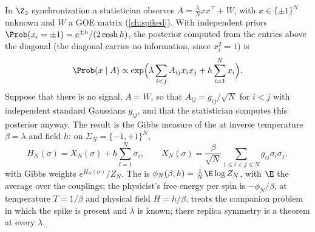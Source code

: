 \begin{refsection}
In $\Z_2$ synchronization a statistician observes $A=\frac\lambda Nxx^\top+W$, with $x\in\{\pm1\}^N$ unknown and $W$ a GOE matrix (\cref{ch:spiked}). With independent priors $\Prob(x_i=\pm1)=e^{\pm h}/(2\cosh h)$, the posterior computed from the entries above the diagonal (the diagonal carries no information, since $x_i^2=1$) is
\[
\Prob(x\mid A)\propto\exp\Bigl(\lambda\sum_{i<j}A_{ij}x_ix_j+h\sum_{i=1}^Nx_i\Bigr).
\]
Suppose that there is no signal, $A=W$, so that $A_{ij}=g_{ij}/\sqrt N$ for $i<j$ with independent standard Gaussians $g_{ij}$, and that the statistician computes this posterior anyway. The result is the Gibbs measure of the  \parencite{SherringtonKirkpatrick1975} at inverse temperature $\beta=\lambda$ and field $h$: on $\Sigma_N=\{-1,+1\}^N$,
\begin{equation}\label{eq:sk:hamiltonian}
H_N(\sigma)=X_N(\sigma)+h\sum_{i=1}^N\sigma_i,\qquad X_N(\sigma)=\frac\beta{\sqrt N}\sum_{1\le i<j\le N}g_{ij}\sigma_i\sigma_j,
\end{equation}
with Gibbs weights $e^{H_N(\sigma)}/Z_N$. The  is $\phi_N(\beta,h)=\frac1N\E\log Z_N$, with $\E$ the average over the couplings; the physicist's free energy per spin is $-\phi_N/\beta$, at temperature $T=1/\beta$ and physical field $H=h/\beta$.  treats the companion problem in which the spike is present and $\lambda$ is known; there replica symmetry is a theorem at every $\lambda$.


\end{refsection}
